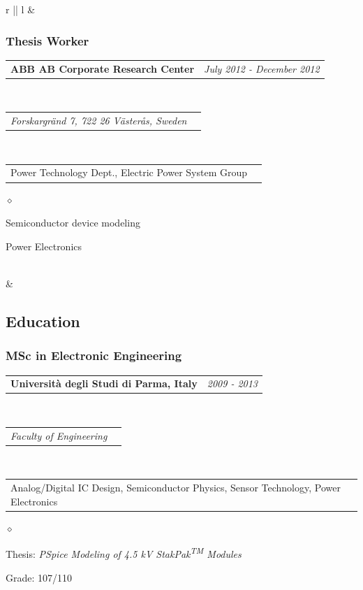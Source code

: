 \documentclass[a4paper]{article}
\makeatletter
\newlength{\sectsep}
\newlength{\subsectsep}
\newcommand{\headerrow}[2]
{\begin{tabular*}{\textwidth}{l@{\extracolsep{\fill}}r}
	#1 &
	#2 \\
\end{tabular*}}
\renewenvironment{itemize}{
  \begin{list}{$\diamond$}{
    \setlength{\topsep}{0.25em}
    \setlength{\itemsep}{0em}
    \setlength{\parskip}{0pt}
    \setlength{\parsep}{0em}
  }
}{
  \end{list}
}
\makeatother
\begin{document}
\begin{longtable}{r || l}
  & \begin{minipage}{0.9\textwidth}
      \vspace{\subsectsep}
      \subsubsection*{Thesis Worker}
      \headerrow
  		{\textbf{ABB AB Corporate Research Center}}{\emph{July 2012 - December 2012}}
      \\
      \headerrow
        {\emph{Forskargränd 7, 722 26 Västerås, Sweden}}{}
      \\
      \headerrow
          {Power Technology Dept., Electric Power System Group}{}

      \begin{itemize}
          \item Semiconductor device modeling
          \item Power Electronics
      \end{itemize}
  \end{minipage} \\[\sectsep]

  & \begin{minipage}{0.9\textwidth}
      \vspace{\sectsep}
      \subsection*{Education}
      \subsubsection*{MSc in Electronic Engineering}
      \headerrow
  		{\textbf{Università degli Studi di Parma, Italy}}{\emph{2009 - 2013}}
      \\
      \headerrow
        {\emph{Faculty of Engineering}}{}
      \\
      \headerrow
        {Analog/Digital IC Design, Semiconductor Physics, Sensor Technology, Power Electronics}{}

      \begin{itemize}
          \item Thesis: \emph{PSpice Modeling of 4.5 kV StakPak\textsuperscript{TM} Modules}
          \item Grade: 107/110
      \end{itemize}
  \end{minipage} \\[\sectsep]


\end{longtable}
\end{document}
